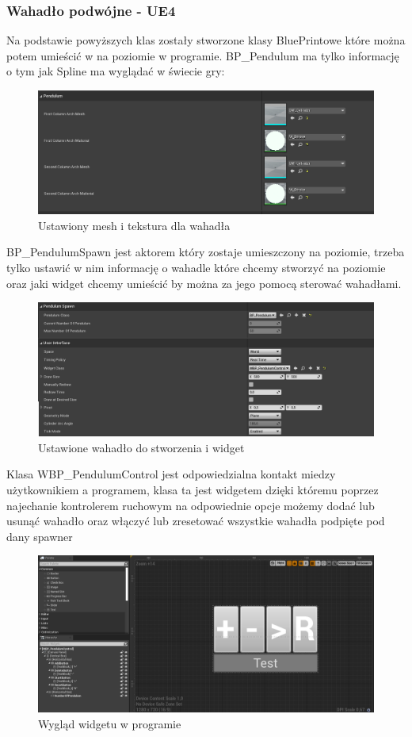 \documentclass[a4paper,12pt,reqno]{article}
\begin{document}
\subsubsection{Wahadło podwójne - UE4}
Na podstawie powyższych klas zostały stworzone klasy BluePrintowe które można potem umieścić w na poziomie w programie. BP\_Pendulum ma tylko informację o tym jak Spline ma wyglądać w świecie gry:

\begin{figure}[H]%
\centering
\includegraphics[width=0.7\columnwidth]{graphics/PendulumBP.png}
\caption{Ustawiony mesh i tekstura dla wahadła 
\label{BPExample}}%
%
\qquad
\end{figure}  

BP\_PendulumSpawn jest aktorem który zostaje umieszczony na poziomie, trzeba tylko ustawić w nim informację o wahadle które chcemy stworzyć na poziomie oraz jaki widget chcemy umieścić by można za jego pomocą sterować wahadłami.

\begin{figure}[H]%
\centering
\includegraphics[width=0.7\columnwidth]{graphics/PendulumSpawnerBP.png}
\caption{Ustawione wahadło do stworzenia i widget 
\label{BPExample}}%
%
\qquad
\end{figure}  

Klasa WBP\_PendulumControl jest odpowiedzialna kontakt miedzy użytkownikiem a programem, klasa ta jest widgetem dzięki któremu poprzez najechanie kontrolerem ruchowym na odpowiednie opcje możemy dodać lub usunąć wahadło oraz włączyć lub zresetować wszystkie wahadła podpięte pod dany spawner 

\begin{figure}[H]%
\centering
\includegraphics[width=0.7\columnwidth]{graphics/PendulumControlBP.png}
\caption{Wygląd widgetu w programie
\label{BPExample}}%
%
\qquad
\end{figure}  
\end{document}

